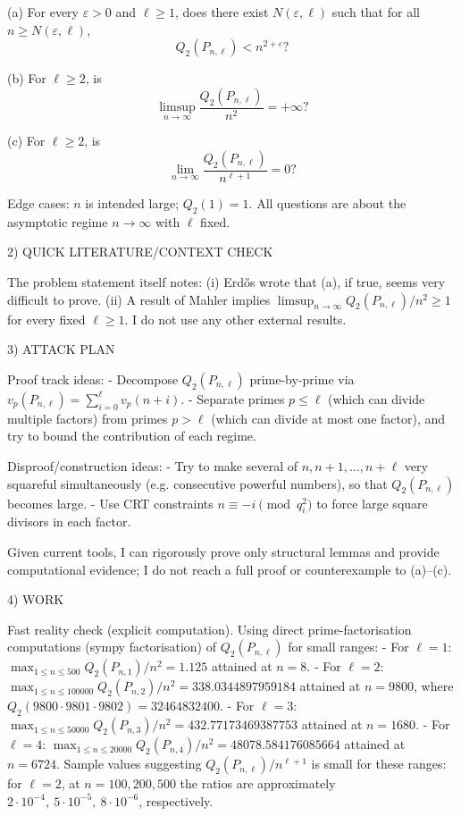 (a) For every \(\varepsilon>0\) and \(\ell\ge 1\), does there exist \(N(\varepsilon,\ell)\) such that for all \(n\ge N(\varepsilon,\ell)\),
\[Q_2(P_{n,\ell})<n^{2+\varepsilon}?\]

(b) For \(\ell\ge 2\), is
\[\limsup_{n\to\infty} \frac{Q_2(P_{n,\ell})}{n^2}=+\infty?\]

(c) For \(\ell\ge 2\), is
\[\lim_{n\to\infty} \frac{Q_2(P_{n,\ell})}{n^{\ell+1}}=0?\]

Edge cases: \(n\) is intended large; \(Q_2(1)=1\). All questions are about the asymptotic regime \(n\to\infty\) with \(\ell\) fixed.

2) QUICK LITERATURE/CONTEXT CHECK

The problem statement itself notes:
(i) Erd\H{o}s wrote that (a), if true, seems very difficult to prove.
(ii) A result of Mahler implies \(\limsup_{n\to\infty} Q_2(P_{n,\ell})/n^2\ge 1\) for every fixed \(\ell\ge 1\).
I do not use any other external results.

3) ATTACK PLAN

Proof track ideas:
- Decompose \(Q_2(P_{n,\ell})\) prime-by-prime via \(v_p(P_{n,\ell})=\sum_{i=0}^{\ell} v_p(n+i)\).
- Separate primes \(p\le \ell\) (which can divide multiple factors) from primes \(p>\ell\) (which can divide at most one factor), and try to bound the contribution of each regime.

Disproof/construction ideas:
- Try to make several of \(n,n+1,\dots,n+\ell\) very squareful simultaneously (e.g. consecutive powerful numbers), so that \(Q_2(P_{n,\ell})\) becomes large.
- Use CRT constraints \(n\equiv -i\pmod{q_i^2}\) to force large square divisors in each factor.

Given current tools, I can rigorously prove only structural lemmas and provide computational evidence; I do not reach a full proof or counterexample to (a)–(c).

4) WORK

Fast reality check (explicit computation).
Using direct prime-factorisation computations (sympy factorisation) of \(Q_2(P_{n,\ell})\) for small ranges:
- For \(\ell=1\): \(\max_{1\le n\le 500} Q_2(P_{n,1})/n^2 = 1.125\) attained at \(n=8\).
- For \(\ell=2\): \(\max_{1\le n\le 100000} Q_2(P_{n,2})/n^2 = 338.0344897959184\) attained at \(n=9800\), where
  \(Q_2(9800\cdot 9801\cdot 9802)=32464832400\).
- For \(\ell=3\): \(\max_{1\le n\le 50000} Q_2(P_{n,3})/n^2 = 432.77173469387753\) attained at \(n=1680\).
- For \(\ell=4\): \(\max_{1\le n\le 20000} Q_2(P_{n,4})/n^2 = 48078.584176085664\) attained at \(n=6724\).
Sample values suggesting \(Q_2(P_{n,\ell})/n^{\ell+1}\) is small for these ranges:
for \(\ell=2\), at \(n=100,200,500\) the ratios are approximately \(2\cdot 10^{-4},\ 5\cdot 10^{-5},\ 8\cdot 10^{-6}\), respectively.

